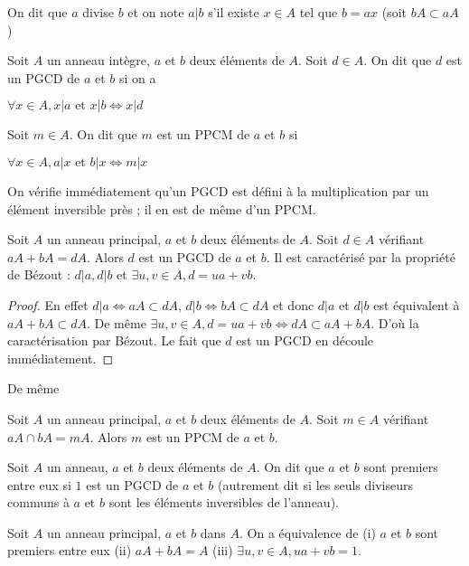 On dit que $a$ divise $b$ et on note $a | b$ s'il
existe $x \in A$ tel que $b = ax$ (soit $bA \subset aA$)

\begin{de}
Soit $A$ un anneau intègre, $a$ et $b$ deux éléments de $A$.
Soit $d \in A$. On dit que $d$ est un PGCD de $a$ et $b$ si on a

$\forall x \in A, x | a \text{ et } x | b \Leftrightarrow x | d$

Soit $m \in A$. On dit que $m$ est un PPCM de $a$ et $b$ si

$\forall x \in A, a | x \text{ et } b | x \Leftrightarrow m | x$
\end{de}

\begin{rem}
On vérifie immédiatement qu'un PGCD est défini à la
multiplication par un élément inversible près ; il en est de même d'un
PPCM.
\end{rem}

\begin{thm}
Soit $A$ un anneau principal, $a$ et $b$ deux éléments de $A$.
Soit $d \in A$ vérifiant $aA + bA = dA$. Alors $d$ est un PGCD de $a$ et $b$. Il est
caractérisé par la propriété de Bézout :
$d | a, d | b$ et
$\exists u,v \in A, d = ua + vb$.
\end{thm}

\begin{proof}
En effet $d | a \Leftrightarrow aA \subset dA$, $d | b \Leftrightarrow bA \subset dA$ et donc
$d | a$ et $d | b$ est
équivalent à $aA + bA \subset dA$. De même $\exists u,v \in A, d = ua + vb \Leftrightarrow dA \subset aA + bA$. D'où la
caractérisation par Bézout. Le fait que $d$ est un PGCD en découle
immédiatement.
\end{proof}

De même

\begin{thm}
Soit $A$ un anneau principal, $a$ et $b$ deux éléments de $A$.
Soit $m \in A$ vérifiant $aA \cap bA = mA$. Alors $m$ est un PPCM de $a$ et $b$.
\end{thm}

\begin{de}
Soit $A$ un anneau, $a$ et $b$ deux éléments de $A$. On dit
que $a$ et $b$ sont premiers entre eux si $1$ est un PGCD de $a$ et $b$ (autrement
dit si les seuls diviseurs communs à $a$ et $b$ sont les éléments
inversibles de l'anneau).
\end{de}

\begin{thm}[Bézout]
Soit $A$ un anneau principal, $a$ et $b$ dans $A$. On
a équivalence de (i) $a$ et $b$ sont premiers entre eux (ii) $aA + bA = A$
(iii) $\exists u,v \in A, ua + vb = 1$.
\end{thm}

